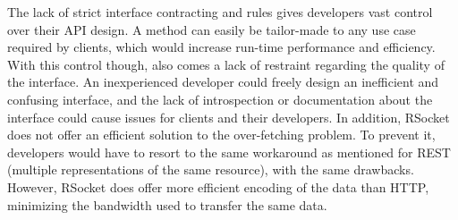 The lack of strict interface contracting and rules gives developers vast control over their API design. A method can easily be tailor-made to any use case required by clients, which would increase run-time performance and efficiency. With this control though, also comes a lack of restraint regarding the quality of the interface. An inexperienced developer could freely design an inefficient and confusing interface, and the lack of introspection or documentation about the interface could cause issues for clients and their developers. In addition, RSocket does not offer an efficient solution to the over-fetching problem. To prevent it, developers would have to resort to the same workaround as mentioned for REST (multiple representations of the same resource), with the same drawbacks. However, RSocket does offer more efficient encoding of the data than HTTP, minimizing the bandwidth used to transfer the same data.